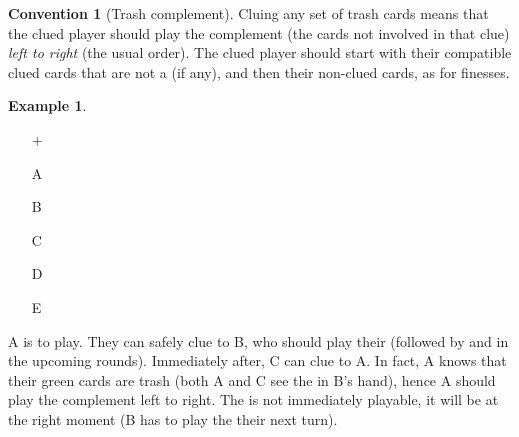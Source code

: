 \documentclass[a4paper]{article}
\theoremstyle{plain}
\theoremstyle{definition}
\newtheorem{example}[theorem]{Example}
\newtheorem{convention}[theorem]{Convention}
\begin{document}
\begin{convention}[Trash complement]
	Cluing any set of trash cards means that the clued player should play the complement (the cards not involved in that clue) \emph{left to right} (the usual order). The clued player should start with their compatible clued cards that are not a  (if any), and then their non-clued cards, as for finesses.
\end{convention}

\begin{example}	\hfill \\
	\begin{minipage}{0.45\textwidth}
		\begin{itemize}
			\item[\Large +]      
			\item[\Large A]    
			\item[\Large B]    
			\item[\Large C]    
			\item[\Large D]    
			\item[\Large E]    
		\end{itemize}
	\end{minipage}%
	\begin{minipage}{0.55\textwidth}
		A is to play. They can safely clue  to B, who should play their  (followed by  and  in the upcoming rounds). Immediately after, C can clue  to A. In fact, A knows that their green cards are trash (both A and C see the  in B's hand), hence A should play the complement left to right. The  is not immediately playable, it will be at the right moment (B has to play the  their next turn).
	\end{minipage}
\end{example} \vspace{0.15 cm}
\end{document}
